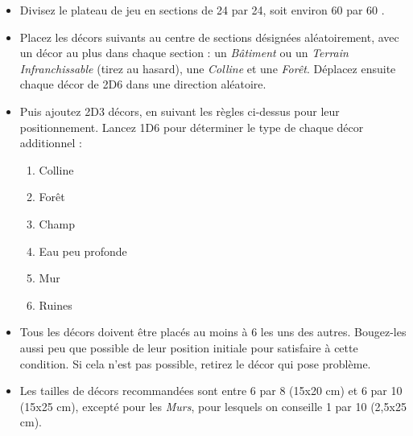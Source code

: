 \begin{itemize}[label={-}]
\item Divisez le plateau de jeu en sections de 24{\pouce} par 24{\pouce}, soit environ 60 {\centi\meter} par 60 {\centi\meter}.

\item Placez les décors suivants au centre de sections désignées aléatoirement, avec un décor au plus dans chaque section : un \emph{Bâtiment} ou un \emph{Terrain Infranchissable} (tirez au hasard), une \emph{Colline} et une \emph{Forêt}. Déplacez ensuite chaque décor de 2D6{\pouce} dans une direction aléatoire.

\item Puis ajoutez 2D3 décors, en suivant les règles ci-dessus pour leur positionnement. Lancez 1D6 pour déterminer le type de chaque décor additionnel :
\begin{enumerate}
\item Colline
\item Forêt
\item Champ
\item Eau peu profonde
\item Mur
\item Ruines
\end{enumerate}

\item Tous les décors doivent être placés au moins à 6{\pouce} les uns des autres. Bougez-les aussi peu que possible de leur position initiale pour satisfaire à cette condition. Si cela n'est pas possible, retirez le décor qui pose problème.
\item Les tailles de décors recommandées sont entre 6{\pouce} par 8{\pouce} (15x20 cm) et 6{\pouce} par 10{\pouce} (15x25 cm), excepté pour les \emph{Murs}, pour lesquels on conseille 1{\pouce} par 10{\pouce} (2,5x25 cm).
\end{itemize}

\section[Type de déploiement]{}

